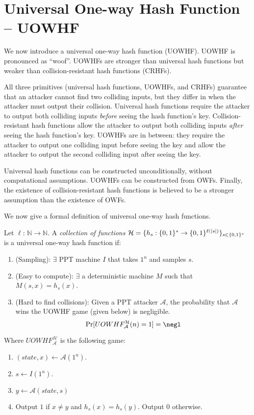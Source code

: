 \section{Universal One-way Hash Function -- UOWHF}
We now introduce a universal one-way hash function (UOWHF). UOWHF is pronounced as ``woof''.
UOWHFs are stronger than universal hash functions but weaker than collision-resistant hash functions (CRHFs). 

All three primitives (universal hash functions, UOWHFs, and CRHFs) guarantee that an attacker cannot find two colliding inputs, but they differ in when the attacker must output their collision. Universal hash functions require the attacker to output both colliding inputs \textit{before} seeing the hash function's key. Collision-resistant hash functions allow the attacker to output both colliding inputs \textit{after} seeing the hash function's key. UOWHFs are in between: they require the attacker to output one colliding input before seeing the key and allow the attacker to output the second colliding input after seeing the key.

Universal hash functions can be constructed unconditionally, without computational assumptions. UOWHFs can be constructed from OWFs. Finally, the existence of collision-resistant hash functions is believed to be a stronger assumption than the existence of OWFs.

We now give a formal definition of universal one-way hash functions. 
\begin{definition}
    Let $\ell$: $\mathbb{N}\rightarrow\mathbb{N}$. A \textit{collection of functions} 
    $\mathcal{H} = \{h_s: \{0,1\}^*\rightarrow\{0,1\}^{\ell(|s|)}\}_{s\in\{0,1\}^{*}}$ is a universal one-way hash function if:
    \begin{enumerate}
        \item (Sampling): $\exists$ PPT machine $I$ that takes $1^n$ and samples $s$.
        \item (Easy to compute): $\exists$ a deterministic machine $M$ such that $M(s,x)=h_s(x)$.
        \item (Hard to find collisions): Given a PPT attacker $\mathcal{A}$, the probability that $\mathcal{A}$ wins the UOWHF game (given below) is negligible. 
        \[
            \Pr[UOWHF^{\mathcal{H}}_{\mathcal{A}}(n)=1]=\negl
        \]
    \end{enumerate}
\end{definition}
Where $UOWHF^{\mathcal{H}}_{\mathcal{A}}$ is the following game:
\begin{enumerate}
    \item $(state, x)\leftarrow\mathcal{A}(1^n)$.
    \item $s\leftarrow I(1^n)$.
    \item $y\leftarrow\mathcal{A}(state, s)$
    \item Output $1$ if $x \neq y$ and $h_s(x)=h_s(y)$. Output $0$ otherwise.
\end{enumerate}


